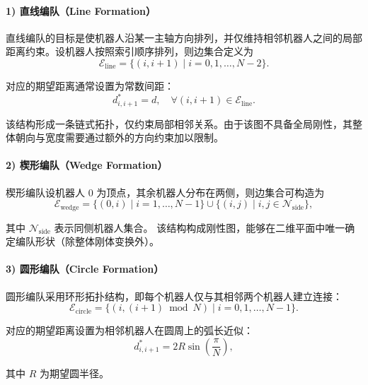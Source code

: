 \paragraph{1) 直线编队（Line Formation）}

直线编队的目标是使机器人沿某一主轴方向排列，并仅维持相邻机器人之间的局部距离约束。设机器人按照索引顺序排列，则边集合定义为
\begin{equation}
    \mathcal{E}_{\text{line}} = \{ (i, i+1) \mid i = 0, 1, \ldots, N-2 \}.
\end{equation}

对应的期望距离通常设置为常数间距：
\begin{equation}
    d_{i,i+1}^* = d, \quad \forall (i,i+1) \in \mathcal{E}_{\text{line}}.
\end{equation}

该结构形成一条链式拓扑，仅约束局部相邻关系。由于该图不具备全局刚性，其整体朝向与宽度需要通过额外的方向约束加以限制。

\paragraph{2) 楔形编队（Wedge Formation）}

楔形编队设机器人 $0$ 为顶点，其余机器人分布在两侧，则边集合可构造为
\begin{equation}
    \mathcal{E}_{\text{wedge}} =
    \{ (0,i) \mid i = 1,\ldots,N-1 \}
    \cup
    \{ (i,j) \mid i,j \in \mathcal{N}_{\text{side}} \},
\end{equation}

其中 $\mathcal{N}_{\text{side}}$ 表示同侧机器人集合。
该结构构成刚性图，能够在二维平面中唯一确定编队形状（除整体刚体变换外）。

\paragraph{3) 圆形编队（Circle Formation）}

圆形编队采用环形拓扑结构，即每个机器人仅与其相邻两个机器人建立连接：
\begin{equation}
    \mathcal{E}_{\text{circle}} =
    \{ (i, (i+1) \bmod N) \mid i = 0,1,\ldots,N-1 \}.
\end{equation}

对应的期望距离设置为相邻机器人在圆周上的弧长近似：
\begin{equation}
    d_{i,i+1}^* = 2R \sin\left(\frac{\pi}{N}\right),
\end{equation}

其中 $R$ 为期望圆半径。

